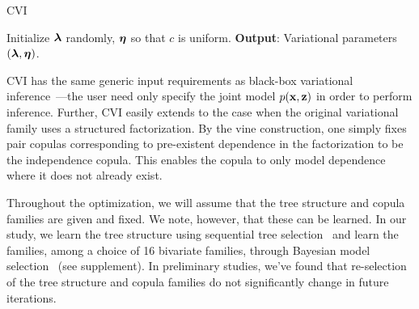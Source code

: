 \begin{algorithm}[t]
  \caption{\Acrfull{CVI}}
  \SetAlgoLined
  \DontPrintSemicolon
  \BlankLine
  \BlankLine
  Initialize $\boldsymbol{\mathbf{\lambda}}$ randomly, $\boldsymbol{\mathbf{\eta}}$ so that $c$ is uniform.\;
  \BlankLine
  \textbf{Output}: Variational parameters $(\boldsymbol{\mathbf{\lambda}},\boldsymbol{\mathbf{\eta}})$.\;
  \label{alg:cvi}
\end{algorithm}
%
\Gls{CVI} has the same generic input requirements as black-box
variational inference~\citep{ranganath2014black}---the user need only
specify the joint model $p(\boldsymbol{\mathbf{x}},\boldsymbol{\mathbf{z}})$ in order to perform inference.
Further, \acrlong{CVI} easily extends to the case when the original
variational family uses a structured factorization. By the vine
construction, one simply fixes pair copulas corresponding to
pre-existent dependence in the factorization to be the independence
copula. This enables the copula to only model dependence where it does
not already exist.

Throughout the optimization, we will assume that the tree structure
and copula families are given and fixed.  We note, however, that these
can be learned. In our study, we learn the tree structure using
sequential tree selection~\citep{dissmann2012selecting} and learn the
families, among a choice of 16 bivariate families, through Bayesian
model selection~\citep{gruber2015sequential} (see supplement). In
preliminary studies, we've found that re-selection of the tree
structure and copula families do not significantly change in future
iterations.

